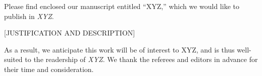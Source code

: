 \documentclass[12pt,stdletter,dateno,sigleft]{newlfm} %
\begin{document}
\begin{newlfm}


Please find enclosed our manuscript entitled ``XYZ,'' which we would like to publish in {\it XYZ}.  


[JUSTIFICATION AND DESCRIPTION]


As a result, we anticipate this work will be of interest to XYZ, and is thus well-suited to the readership of {\it XYZ}.  We thank the referees and editors in advance for their time and consideration.

\end{newlfm}

\end{document}
